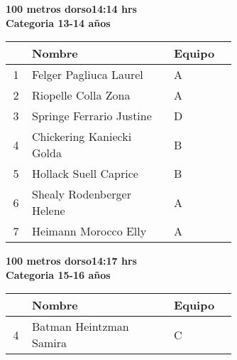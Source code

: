 \begin{minipage}{0.95\linewidth}\vspace{0.5cm} 
\begin{flushleft}
\textbf{
\hspace{-0.15cm}100 metros dorso\hspace{1.5cm}14:14 hrs \\Categoria 13-14 años}\vspace{-0.2cm} 
\end{flushleft}
\begin{tabular}{cp{0.63\linewidth}l}
\hline
& \textbf{Nombre} & \textbf{Equipo} \\ \hline
1 & Felger Pagliuca Laurel & A \\ 
2 & Riopelle Colla Zona & A \\ 
3 & Springe Ferrario Justine & D \\ 
4 & Chickering Kaniecki Golda & B \\ 
5 & Hollack Suell Caprice & B \\ 
6 & Shealy Rodenberger Helene & A \\ 
7 & Heimann Morocco Elly & A \\ 
\end{tabular}
\end{minipage}
\begin{minipage}{0.95\linewidth}\vspace{0.5cm} 
\begin{flushleft}
\textbf{
\hspace{-0.15cm}100 metros dorso\hspace{1.5cm}14:17 hrs \\Categoria 15-16 años}\vspace{-0.2cm} 
\end{flushleft}
\begin{tabular}{cp{0.63\linewidth}l}
\hline
& \textbf{Nombre} & \textbf{Equipo} \\ \hline
4 & Batman Heintzman Samira & C \\ 
\end{tabular}
\end{minipage}
